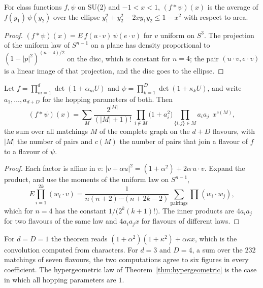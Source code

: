 \begin{lemma}\label{lem:ellipse}
For class functions $f,\psi$ on SU(2) and $-1<x<1$, $(f*\psi)(x)$ is the average of $f(y_1)\,\psi(y_2)$ over the ellipse $y_1^2+y_2^2-2xy_1y_2\le1-x^2$ with respect to area.
\end{lemma}

\begin{proof}
$(f*\psi)(x)=E\,f(u\cdot v)\,\psi(e\cdot v)$ for $v$ uniform on $S^3$. The projection of the uniform law of $S^{n-1}$ on a plane has density proportional to $(1-|p|^2)^{(n-4)/2}$ on the disc, which is constant for $n=4$; the pair $(u\cdot v,e\cdot v)$ is a linear image of that projection, and the disc goes to the ellipse.
\end{proof}

\begin{theorem}\label{thm:matching}
Let $f=\prod_{m=1}^d\det(1+\alpha_mU)$ and $\psi=\prod_{k=1}^D\det(1+\kappa_kU)$, and write $a_1,\dots,a_{d+D}$ for the hopping parameters of both. Then
\[
(f*\psi)(x)=\sum_{M}\frac{2^{|M|}}{(|M|+1)!}\ \prod_{i\notin M}\big(1+a_i^2\big)\prod_{\{i,j\}\in M}a_ia_j\ \ x^{c(M)},
\]
the sum over all matchings $M$ of the complete graph on the $d+D$ flavours, with $|M|$ the number of pairs and $c(M)$ the number of pairs that join a flavour of $f$ to a flavour of $\psi$.
\end{theorem}

\begin{proof}
Each factor is affine in $v$: $|v+\alpha u|^2=(1+\alpha^2)+2\alpha\,u\cdot v$. Expand the product, and use the moments of the uniform law on $S^{n-1}$,
\[
E\prod_{i=1}^{2k}(w_i\cdot v)=\frac{1}{n(n+2)\cdots(n+2k-2)}\sum_{\text{pairings}}\prod(w_i\cdot w_j),
\]
which for $n=4$ has the constant $1/\big(2^k(k+1)!\big)$. The inner products are $4a_ia_j$ for two flavours of the same law and $4a_ia_jx$ for flavours of different laws.
\end{proof}

For $d=D=1$ the theorem reads $(1+\alpha^2)(1+\kappa^2)+\alpha\kappa x$, which is the convolution computed from characters. For $d=3$ and $D=4$, a sum over the $232$ matchings of seven flavours, the two computations agree to six figures in every coefficient. The hypergeometric law of Theorem~\ref{thm:hypergeometric} is the case in which all hopping parameters are $1$.

